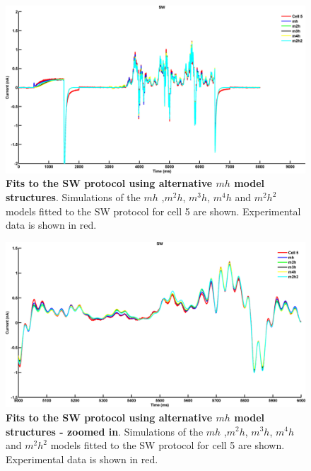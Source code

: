 \documentclass[11pt,a4paper,oneside]{article}
\begin{document}
\begin{figure}[ht]
\begin{center}
\includegraphics[scale=0.42]{Figures/Fig_mh_family_16713110_FP_sine_Wave_CP_sine_wave.png}
\caption{\textbf{Fits to the SW protocol using alternative $mh$ model structures}. Simulations of the $mh$ ,$m^2h$, $m^3h$, $m^4h$ and $m^2h^2$ models fitted to the SW protocol for cell 5 are shown. Experimental data is shown in red.} 
\label{Fig_mh_SW}
\end{center}
\end{figure}

\begin{figure}[hb]
\begin{center}
\includegraphics[scale=0.42]{Figures/Fig_mh_family_16713110_FP_sine_wave_CP_sine_wave_zoom.png}
\caption{\textbf{Fits to the SW protocol using alternative $mh$ model structures - zoomed in}.  Simulations of the $mh$ ,$m^2h$, $m^3h$, $m^4h$ and $m^2h^2$ models fitted to the SW protocol for cell 5 are shown. Experimental data is shown in red.} 
\label{Fig_mh_SW_Zoom}
\end{center}
\end{figure}
\end{document}
